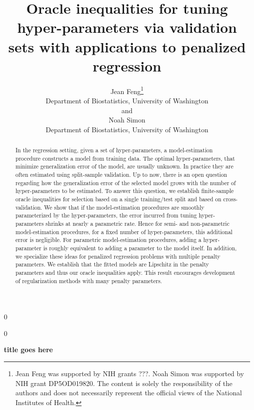 \documentclass[12pt]{article}
\newcommand{\blind}{0}
\begin{document}
\def\spacingset#1{\renewcommand{\baselinestretch}%
{#1}\small\normalsize} \spacingset{1}



\blind
{
  \title{\bf Oracle inequalities for tuning hyper-parameters via validation sets with applications to penalized regression}
  \author{Jean Feng\thanks{
    Jean Feng was supported by NIH grants ???. %
    Noah Simon was supported by NIH grant DP5OD019820.
    The content is solely the responsibility of the authors and does not necessarily represent the official views of the National Institutes of Health.}\\
    Department of Biostatistics, University of Washington\\
    and \\
    Noah Simon \\
    Department of Biostatistics, University of Washington}
  \maketitle
} \fi

\blind
{
  \bigskip
  \bigskip
  \bigskip
  \begin{center}
    {\LARGE\bf title goes here}
\end{center}
  \medskip
} \fi

\bigskip
\begin{abstract}

In the regression setting, given a set of hyper-parameters, a model-estimation procedure constructs a model from training data. The optimal hyper-parameters, that minimize generalization error of the model, are usually unknown. In practice they are often estimated using split-sample validation. Up to now, there is an open question regarding how the generalization error of the selected model grows with the number of hyper-parameters to be estimated. To answer this question, we establish finite-sample oracle inequalities for selection based on a single training/test split and based on cross-validation. We show that if the model-estimation procedures are smoothly parameterized by the hyper-parameters, the error incurred from tuning hyper-parameters shrinks at nearly a parametric rate. Hence for semi- and non-parametric model-estimation procedures, for a fixed number of hyper-parameters, this additional error is negligible. For parametric model-estimation procedures, adding a hyper-parameter is roughly equivalent to adding a parameter to the model itself. In addition, we specialize these ideas for penalized regression problems with multiple penalty parameters. We establish that the fitted models are Lipschitz in the penalty parameters and thus our oracle inequalities apply. This result encourages development of regularization methods with many penalty parameters.
\end{abstract}
\end{document}
